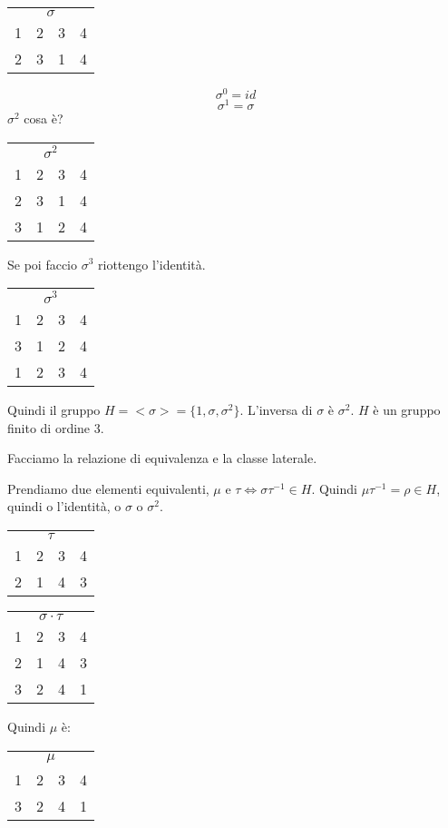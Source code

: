 \begin{tabular}{cccc}
\multicolumn{4}{c}{$\sigma$} \\
1 & 2 & 3 & 4 \\
2 & 3 & 1 & 4 
\end{tabular}

\[
\sigma^{0} = id
\]
\[
\sigma^{1} = \sigma
\]
$\sigma^{2}$ cosa \`e?

\begin{tabular}{cccc}
\multicolumn{4}{c}{$\sigma^{2}$} \\
1 & 2 & 3 & 4 \\
2 & 3 & 1 & 4 \\
3 & 1 & 2 & 4
\end{tabular}

Se poi faccio $\sigma^{3}$ riottengo l'identit\`a.

\begin{tabular}{cccc}
\multicolumn{4}{c}{$\sigma^{3}$} \\
1 & 2 & 3 & 4 \\
3 & 1 & 2 & 4 \\
1 & 2 & 3 & 4 
\end{tabular}

Quindi il gruppo $H = < \sigma > = \{ 1 , \sigma, \sigma^{2} \}$. L'inversa di $\sigma$ \`e $\sigma^{2}$. $H$ \`e un gruppo finito di ordine 3.

Facciamo la relazione di equivalenza e la classe laterale.

Prendiamo due elementi equivalenti, $\mu$  e $\tau \Leftrightarrow \sigma \tau^{-1} \in H$. Quindi $\mu \tau^{-1} = \rho \in H$, quindi o l'identit\`a, o $\sigma$ o $\sigma^{2}$.

\begin{tabular}{cccc}
\multicolumn{4}{c}{$\tau$} \\
1 & 2 & 3 & 4 \\
2 & 1 & 4 & 3
\end{tabular}

\begin{tabular}{cccc}
\multicolumn{4}{c}{$\sigma \cdot \tau$} \\
1 & 2 & 3 & 4 \\
2 & 1 & 4 & 3 \\
3 & 2 & 4 & 1
\end{tabular}

Quindi $\mu$ \`e:

\begin{tabular}{cccc}
\multicolumn{4}{c}{$\mu$} \\
1 & 2 & 3 & 4 \\
3 & 2 & 4 & 1
\end{tabular}

